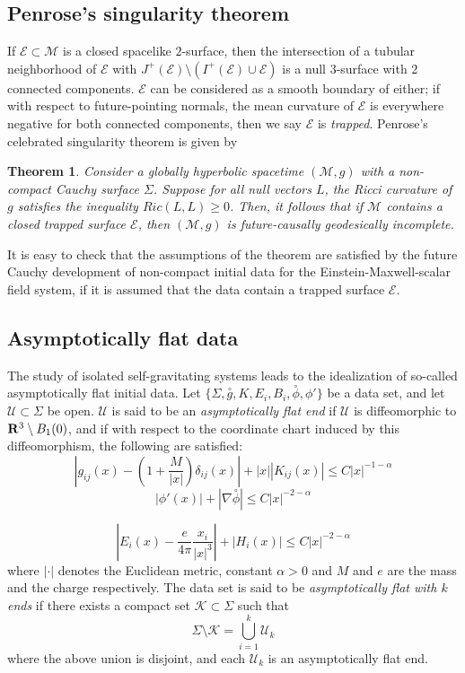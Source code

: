 \documentclass{article}
\newtheorem{theorem}{Theorem}[section]
\begin{document}
\subsection{Penrose's singularity theorem}
If $\mathcal{E}\subset\mathcal{M}$ is a closed spacelike $2$-surface, then
the intersection of a tubular neighborhood of $\mathcal{E}$ with 
$J^+(\mathcal{E})\setminus (I^+(\mathcal{E})\cup \mathcal{E})$ 
is a null $3$-surface with $2$ connected
components. $\mathcal{E}$ can be considered as a smooth boundary of either;
if with respect to future-pointing normals, the mean curvature
of $\mathcal{E}$ is everywhere negative for both connected components, 
then we say $\mathcal{E}$ is \emph{trapped}.
Penrose's celebrated singularity theorem is given by
\begin{theorem}
\label{celebrated}
Consider a globally hyperbolic spacetime $(\mathcal{M},g)$
with a non-compact Cauchy surface $\Sigma$. 
Suppose for all null vectors
$L$, the Ricci curvature of $g$ satisfies the inequality
$Ric(L,L)\ge0$. Then, it follows that 
if $\mathcal{M}$ contains a closed trapped
surface $\mathcal{E}$, 
then $(\mathcal{M},g)$ is 
future-causally geodesically incomplete.
\end{theorem}
It is easy to check that the assumptions of the theorem are
satisfied by the future Cauchy development of non-compact initial data
for the Einstein-Maxwell-scalar field system, if it is assumed
that the data contain a trapped surface $\mathcal{E}$.

\subsection{Asymptotically flat data}
The study of isolated self-gravitating systems leads to the idealization
of so-called asymptotically flat initial data. Let 
$\{\Sigma,\stackrel{\circ}{g},K,E_i,B_i,
\stackrel{\circ}{\phi},\phi'\}$ be
a data set, and let $\mathcal{U}\subset \Sigma$ be open. $\mathcal{U}$
is said to be an \emph{asymptotically flat end} if
$\mathcal{U}$
is diffeomorphic to ${\bf R}^3\setminus B_1(0)$, and if
with respect to the coordinate chart induced by this diffeomorphism,
the following are satisfied:
\[
\left|g_{ij}(x)-
\left(1+\frac M{|x|}\right)\delta_{ij}(x)\right|+ 
|x||K_{ij}(x)|\le C |x|^{-1-\alpha}
\]  
\[
|\phi'(x)|+ |\nabla\stackrel\circ{\phi}| \le C|x|^{-2-\alpha} 
\]

\begin{equation}
\label{nomag}
\left|E_{i}(x)- \frac {e}{4\pi} \frac{x_i}{|x|^3}\right| + |H_i(x)| \le C|x|^{-2-\alpha}
\end{equation}
where $|\cdot|$ denotes the Euclidean metric, constant $\alpha>0$ and $M$ and $e$
are the mass and the charge respectively.
The data set is said to 
be \emph{asymptotically flat with $k$ ends} if 
there exists a compact set $\mathcal{K}\subset\Sigma$ such that
\[
\Sigma\setminus \mathcal{K}=\bigcup_{i=1}^k \mathcal{U}_k
\]
where the above union is disjoint, and each $\mathcal{U}_k$ is
an asymptotically flat end.
\end{document}
